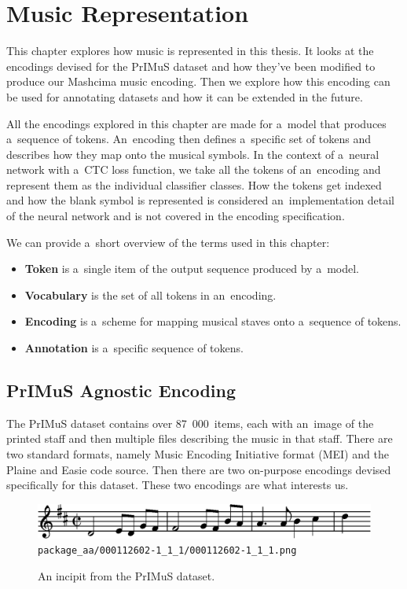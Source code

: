 \chapter{Music Representation}
\label{chap:MusicRepresentation}

This chapter explores how music is represented in this thesis. It looks at the encodings devised for the PrIMuS dataset and how they've been modified to produce our Mashcima music encoding. Then we explore how this encoding can be used for annotating datasets and how it can be extended in the future.

All the encodings explored in this chapter are made for a~model that produces a~sequence of tokens. An~encoding then defines a~specific set of tokens and describes how they map onto the musical symbols. In the context of a~neural network with a~CTC loss function, we take all the tokens of an~encoding and represent them as the individual classifier classes. How the tokens get indexed and how the blank symbol is represented is considered an~implementation detail of the neural network and is not covered in the encoding specification.

We can provide a~short overview of the terms used in this chapter:

\begin{itemize}
\item \textbf{Token} is a~single item of the output sequence produced by a~model.
\item \textbf{Vocabulary} is the set of all tokens in an~encoding.
\item \textbf{Encoding} is a~scheme for mapping musical staves onto a~sequence of tokens.
\item \textbf{Annotation} is a~specific sequence of tokens.
\end{itemize}


\section{PrIMuS Agnostic Encoding}

The PrIMuS dataset contains over 87~000~items, each with an~image of the printed staff and then multiple files describing the music in that staff. There are two standard formats, namely Music Encoding Initiative format (MEI) and the Plaine and Easie code source. Then there are two on-purpose encodings devised specifically for this dataset. These two encodings are what interests us.

\begin{figure}[h]
    \centering
    \includegraphics[width=140mm]{../img/primus-incipit}
    \verb`package_aa/000112602-1_1_1/000112602-1_1_1.png`
    \caption{An incipit from the PrIMuS dataset.}
    \label{fig4:PrimusIncipit}
\end{figure}

